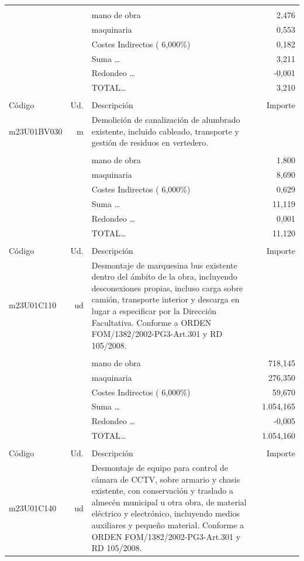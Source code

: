 \documentclass{book}%
\begin{document}
\begin{supertabular}{l r p{60mm} r}
&&&\\%
&&mano de obra&     2,476\\%
&&maquinaria&     0,553\\%
&&Costes Indirectos (     6,000\%)&     0,182\\%
&&Suma \ldots&     3,211\\%
&&Redondeo \ldots&    {-}0,001\\%
%
&&TOTAL\ldots&     3,210\\%
&&&\\%
Código&Ud.&Descripción&Importe\\%
\hline%
m23U01BV030&m&Demolición de canalización de alumbrado existente, incluido cableado, transporte y gestión de residuos en vertedero.&\\%
&&&\\%
&&mano de obra&     1,800\\%
&&maquinaria&     8,690\\%
&&Costes Indirectos (     6,000\%)&     0,629\\%
&&Suma \ldots&    11,119\\%
&&Redondeo \ldots&     0,001\\%
%
&&TOTAL\ldots&    11,120\\%
&&&\\%
Código&Ud.&Descripción&Importe\\%
\hline%
m23U01C110&ud&Desmontaje de marquesina bus existente dentro del ámbito de la obra, incluyendo desconexiones propias, incluso carga sobre camión, transporte interior y descarga en lugar a especificar por la Dirección Facultativa. Conforme a ORDEN FOM/1382/2002{-}PG3{-}Art.301 y RD 105/2008.&\\%
&&&\\%
&&mano de obra&   718,145\\%
&&maquinaria&   276,350\\%
&&Costes Indirectos (     6,000\%)&    59,670\\%
&&Suma \ldots& 1.054,165\\%
&&Redondeo \ldots&    {-}0,005\\%
%
&&TOTAL\ldots& 1.054,160\\%
&&&\\%
Código&Ud.&Descripción&Importe\\%
\hline%
m23U01C140&ud&Desmontaje de equipo para control de cámara de CCTV, sobre armario y chasis existente, con conservación y traslado a almecén municipal u otra obra, de material eléctrico y electrónico, incluyendo medios auxiliares y pequeño material. Conforme a ORDEN FOM/1382/2002{-}PG3{-}Art.301 y RD 105/2008.&\\%

\end{supertabular}
\end{document}

